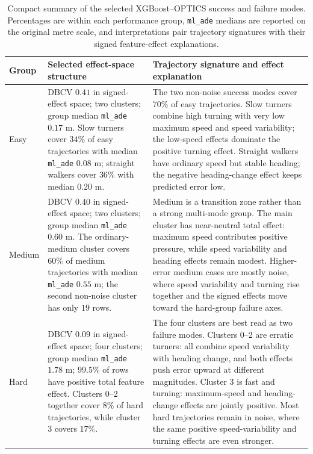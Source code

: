 \documentclass[12pt]{article}
\begin{document}
\begin{table}[H]
  \centering
  \caption[Summary of the selected success and failure modes]{Compact summary of the selected XGBoost--OPTICS success and failure modes. Percentages are within each performance group, \texttt{ml\_ade} medians are reported on the original metre scale, and interpretations pair trajectory signatures with their signed feature-effect explanations.}
  \label{tab:rq2_regime_summary}
  \small
  \renewcommand{\arraystretch}{1.16}
  \begin{tabular}{@{}>{\raggedright\arraybackslash}p{}>{\raggedright\arraybackslash}p{}>{\raggedright\arraybackslash}p{}@{}}
    \toprule
    \textbf{Group} & \textbf{Selected effect-space structure} & \textbf{Trajectory signature and effect explanation} \\
    \midrule
    Easy &
    DBCV $0.41$ in signed-effect space; two clusters; group median \texttt{ml\_ade} $0.17$ m. Slow turners cover $34\%$ of easy trajectories with median \texttt{ml\_ade} $0.08$ m; straight walkers cover $36\%$ with median $0.20$ m. &
    The two non-noise success modes cover $70\%$ of easy trajectories. Slow turners combine high turning with very low maximum speed and speed variability; the low-speed effects dominate the positive turning effect. Straight walkers have ordinary speed but stable heading; the negative heading-change effect keeps predicted error low. \\
    \addlinespace
    Medium &
    DBCV $0.40$ in signed-effect space; two clusters; group median \texttt{ml\_ade} $0.60$ m. The ordinary-medium cluster covers $60\%$ of medium trajectories with median \texttt{ml\_ade} $0.55$ m; the second non-noise cluster has only $19$ rows. &
    Medium is a transition zone rather than a strong multi-mode group. The main cluster has near-neutral total effect: maximum speed contributes positive pressure, while speed variability and heading effects remain modest. Higher-error medium cases are mostly noise, where speed variability and turning rise together and the signed effects move toward the hard-group failure axes. \\
    \addlinespace
    Hard &
    DBCV $0.09$ in signed-effect space; four clusters; group median \texttt{ml\_ade} $1.78$ m; $99.5\%$ of rows have positive total feature effect. Clusters 0--2 together cover $8\%$ of hard trajectories, while cluster 3 covers $17\%$. &
    The four clusters are best read as two failure modes. Clusters 0--2 are erratic turners: all combine speed variability with heading change, and both effects push error upward at different magnitudes. Cluster 3 is fast and turning: maximum-speed and heading-change effects are jointly positive. Most hard trajectories remain in noise, where the same positive speed-variability and turning effects are even stronger. \\
    \bottomrule
  \end{tabular}
\end{table}
\end{document}

